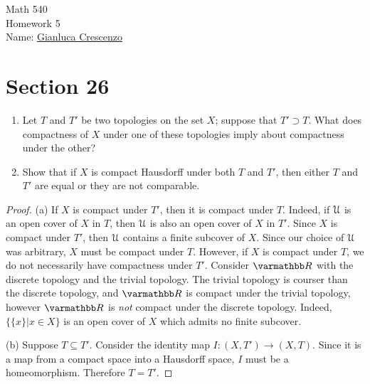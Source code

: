 \documentclass[10pt,oneside,openany]{memoir}
\begin{document}
\begin{center}
    {\large Math 540 \\[0.1in]Homework 5}\\[.175in]
    {Name:} {\underline{Gianluca Crescenzo\hspace*{2in}}}\\[0.15in]
    \end{center}
    \vspace{4pt}
\section*{Section 26}
\begin{exercise}[manual-num={1}]
\phantom{a}
\begin{enumerate}[label = (\alph*),itemsep=1pt,topsep=3pt]
    \item Let $T$ and $T'$ be two topologies on the set $X$; suppose that $T' \supset T$. What does compactness of $X$ under one of these topologies imply about compactness under the other?
    \item Show that if $X$ is compact Hausdorff under both $T$ and $T'$, then either $T$ and $T'$ are equal or they are not comparable.
\end{enumerate}
\end{exercise}
    \begin{proof}
        (a) If $X$ is compact under $T'$, then it is compact under $T$. Indeed, if $\mathcal{U}$ is an open cover of $X$ in $T$, then $\mathcal{U}$ is also an open cover of $X$ in $T'$. Since $X$ is compact under $T'$, then $\mathcal{U}$ contains a finite subcover of $X$. Since our choice of $\mathcal{U}$ was arbitrary, $X$ must be compact under $T$. However, if $X$ is compact under $T$, we do not necessarily have compactness under $T'$. Consider $\bfR$ with the discrete topology and the trivial topology. The trivial topology is courser than the discrete topology, and $\bfR$ is compact under the trivial topology, however $\bfR$ is \textit{not} compact under the discrete topology. Indeed, $\{\{x\}| x \in X\}$ is an open cover of $X$ which admits no finite subcover.

        (b) Suppose $T \subseteq T'$. Consider the identity map $I:(X,T') \rightarrow (X,T)$. Since it is a map from a compact space into a Hausdorff space, $I$ must be a homeomorphism. Therefore $T = T'$.
    \end{proof}
\end{document}
